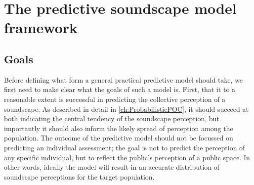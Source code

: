 \chapter{The predictive soundscape model framework}
\label{ch:bayes}






\section{Goals}
Before defining what form a general practical predictive model should take, we first need to make clear what the goals of such a model is. First, that it to a reasonable extent is successful in predicting the collective perception of a soundscape. As described in detail in \cref{ch:ProbabilisticPOC}, it should succeed at both indicating the central tendency of the soundscape perception, but importantly it should also inform the likely spread of perception among the population. The outcome of the predictive model should not be focussed on predicting an individual assessment; the goal is not to predict the perception of any specific individual, but to reflect the public's perception of a public space. In other words, ideally the model will result in an accurate distribution of soundscape perceptions for the target population. 

